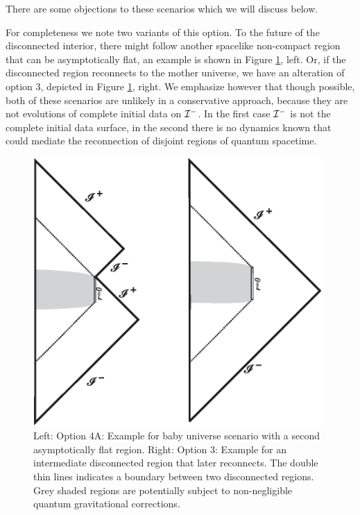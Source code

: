 \documentclass[12pt]{article}
\begin{document}
There are some objections to these scenarios which we will discuss below.

For completeness we note two variants of this option. To the future of the disconnected interior, there might follow another spacelike non-compact region that can be
asymptotically flat, an example is shown in Figure \ref{2ar}, left. Or, if the disconnected region reconnects to the
mother universe, we have an alteration of option 3, depicted in Figure \ref{2ar}, right. We emphasize however that though possible, both of these scenarios are
unlikely in a conservative approach, because they are not evolutions of complete initial data on ${\cal I}^-$.  In the first case ${\cal I}^-$ is not the complete initial data surface, in the second there is no dynamics known that could mediate the reconnection of disjoint regions
of quantum spacetime. 

\begin{figure}[ht]
\centering \includegraphics[width=11cm]{alts.eps}

\caption{Left: Option 4A: Example for baby universe scenario with a second asymptotically flat region. Right: Option 3: Example for an intermediate disconnected region that later reconnects. The double thin lines indicates a boundary between two disconnected regions. Grey shaded regions are potentially subject to non-negligible quantum gravitational corrections.
\label{2ar}}
\end{figure}
\end{document}
